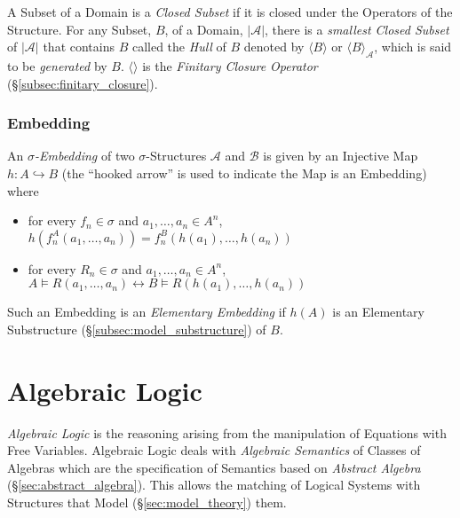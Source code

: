 \documentclass{article}
\begin{document}
A Subset of a Domain is a \emph{Closed Subset} if it is closed under
the Operators of the Structure. For any Subset, $B$, of a Domain,
$|\mathcal{A}|$, there is a \emph{smallest Closed Subset} of
$|\mathcal{A}|$ that contains $B$ called the \emph{Hull} of $B$
denoted by $\langle B \rangle$ or $\langle B \rangle_{\mathcal{A}}$,
which is said to be \emph{generated} by $B$. $\langle \rangle$ is the
\emph{Finitary Closure Operator} (\S\ref{subsec:finitary_closure}).



\subsubsection{Embedding}\label{subsec:sigma_embedding}


An \emph{$\sigma$-Embedding} of two $\sigma$-Structures $\mathcal{A}$
and $\mathcal{B}$ is given by an Injective Map $h: A \hookrightarrow
B$ (the ``hooked arrow'' is used to indicate the Map is an Embedding)
where
\begin{itemize}
\item for every $f_n \in \sigma$ and $a_1, \ldots, a_n \in A^n$,
  $h(f_{n}^A(a_1,\ldots,a_n)) = f_{n}^B(h(a_1),\ldots,h(a_n))$
\item for every $R_n \in \sigma$ and $a_1, \ldots, a_n \in A^n$, $A
  \vDash R(a_1, \ldots, a_n) \leftrightarrow B \vDash R(h(a_1),
  \ldots, h(a_n))$
\end{itemize}
Such an Embedding is an \emph{Elementary Embedding} if $h(A)$ is an
Elementary Substructure (\S\ref{subsec:model_substructure}) of $B$.



\section{Algebraic Logic}

\emph{Algebraic Logic} is the reasoning arising from the manipulation
of Equations with Free Variables. Algebraic Logic deals with
\emph{Algebraic Semantics} of Classes of Algebras which are the
specification of Semantics based on \emph{Abstract Algebra}
(\S\ref{sec:abstract_algebra}). This allows the matching of Logical
Systems with Structures that Model (\S\ref{sec:model_theory}) them.
\end{document}
